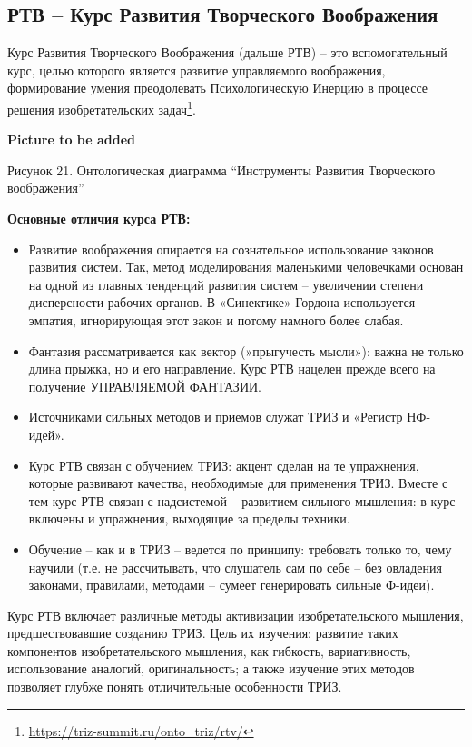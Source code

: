 \documentclass[11pt,a4paper]{article}
\newcommand{\addpicture}{\textbf{Picture to be added}\par}
\begin{document}
\subsection{РТВ -- Курс Развития Творческого Воображения}

Курс Развития Творческого Воображения (дальше РТВ) --
это вспомогательный курс, целью которого является развитие управляемого
воображения, формирование умения преодолевать Психологическую Инерцию в
процессе решения изобретательских
задач\footnote{\url{https://triz-summit.ru/onto_triz/rtv/}}. 
\begin{center}
  \addpicture
  Рисунок 21. Онтологическая диаграмма “Инструменты Развития Творческого
  воображения”
\end{center}
\textbf{Основные отличия курса РТВ:}
\begin{itemize}
\item[1.] Развитие воображения опирается на сознательное использование законов
  развития систем. Так, метод моделирования маленькими человечками основан на
  одной из главных тенденций развития систем -- увеличении степени
  дисперсности рабочих органов. В «Синектике» Гордона используется эмпатия,
  игнорирующая этот закон и потому намного более слабая.
\item[2.] Фантазия рассматривается как вектор (»прыгучесть мысли»): важна не
  только длина прыжка, но и его направление. Курс РТВ нацелен прежде всего на
  получение УПРАВЛЯЕМОЙ ФАНТАЗИИ.
\item[3.] Источниками сильных методов и приемов служат ТРИЗ и «Регистр
  НФ-идей».
\item[4.] Курс РТВ связан с обучением ТРИЗ: акцент сделан на те упражнения,
  которые развивают качества, необходимые для применения ТРИЗ. Вместе с тем
  курс РТВ связан с надсистемой -- развитием сильного мышления: в курс
  включены и упражнения, выходящие за пределы техники.
\item[5.] Обучение -- как и в ТРИЗ -- ведется по принципу: требовать только
  то, чему научили (т.е. не рассчитывать, что слушатель сам по себе -- без
  овладения законами, правилами, методами -- сумеет генерировать сильные
  Ф-идеи).
\end{itemize}
Курс РТВ включает различные методы активизации изобретательского мышления,
предшествовавшие созданию ТРИЗ. Цель их изучения: развитие таких компонентов
изобретательского мышления, как гибкость, вариативность, использование
аналогий, оригинальность; а также изучение этих методов позволяет глубже
понять отличительные особенности ТРИЗ.
\end{document}

